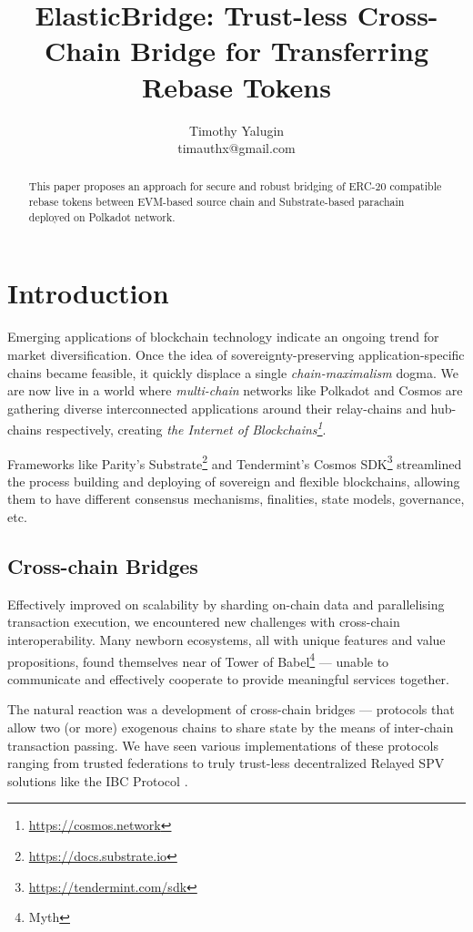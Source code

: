 \documentclass{article}
\title{ElasticBridge: Trust-less Cross-Chain Bridge for Transferring Rebase Tokens}
\author{Timothy Yalugin\\timauthx@gmail.com}
\begin{document}
\maketitle

\begin{abstract}

This paper proposes an approach for secure and robust bridging of ERC-20 compatible rebase tokens between EVM-based source chain and Substrate-based parachain deployed on Polkadot network.

\end{abstract}

\section{Introduction}

Emerging applications of blockchain technology indicate an ongoing trend for market diversification. Once the idea of sovereignty-preserving application-specific chains became feasible, it quickly displace a single \textit{chain-maximalism} dogma. We are now live in a world where \textit{multi-chain} networks like Polkadot \cite{wood2016polkadot} and Cosmos \cite{kwon2016cosmos} are gathering diverse interconnected applications around their relay-chains and hub-chains respectively, creating \textit{the Internet of Blockchains\footnote{\url{https://cosmos.network}}}.

Frameworks like Parity's Substrate\footnote{\url{https://docs.substrate.io}} and Tendermint's Cosmos SDK\footnote{\url{https://tendermint.com/sdk}} streamlined the process building and deploying of sovereign and flexible blockchains, allowing them to have different consensus mechanisms, finalities, state models, governance, etc.

\subsection{Cross-chain Bridges}

Effectively improved on scalability by sharding on-chain data and parallelising transaction execution, we encountered new challenges with cross-chain interoperability. Many newborn ecosystems, all with unique features and value propositions, found themselves near of Tower of Babel\footnote{Myth} --- unable to communicate and effectively cooperate to provide meaningful services together.

The natural reaction was a development of cross-chain bridges --- protocols that allow two (or more) exogenous chains to share state by the means of inter-chain transaction passing. We have seen various implementations of these protocols ranging from trusted federations to truly trust-less decentralized Relayed SPV solutions like the IBC Protocol \cite{goes2020ibc}.
\end{document}
